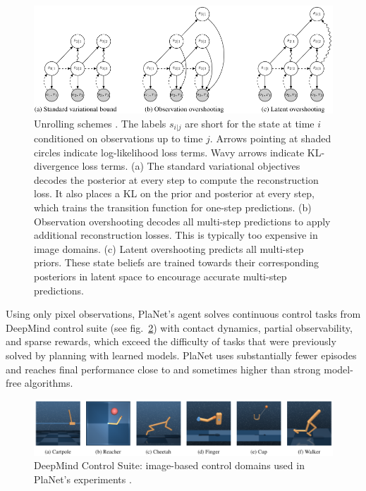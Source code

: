 \begin{figure}[H]
\includegraphics[width=1.0\textwidth,keepaspectratio]{figures/PlaNet/overshooting.png}
\caption[PlaNet latent dynamics model unrolling schemes]{Unrolling schemes \protect\cite{Algo.PlaNet}. The labels $s_{i|j}$ are short for the state at time $i$ conditioned on observations up to time $j$. Arrows pointing at shaded circles indicate log-likelihood loss terms. Wavy arrows indicate KL-divergence loss terms. (a) The standard variational objectives decodes the posterior at every step to compute the reconstruction loss. It also places a KL on the prior and posterior at every step, which trains the transition function for one-step predictions. (b) Observation overshooting decodes all multi-step predictions to apply additional reconstruction losses. This is typically too expensive in image domains. (c) Latent overshooting predicts all multi-step priors. These state beliefs are trained towards their corresponding posteriors in latent space to encourage accurate multi-step predictions.}
\label{Fig.PlaNetModelUnrolling}
\end{figure}

Using only pixel observations, PlaNet's agent solves continuous control tasks from DeepMind control suite (see fig.~\ref{Fig.DeepMindControlSuite}) with contact dynamics, partial observability, and sparse rewards, which exceed the difficulty of tasks that were previously solved by planning with learned models. PlaNet uses substantially fewer episodes and reaches final performance close to and sometimes higher than strong model-free algorithms.

\begin{figure}[H]
\includegraphics[width=1.0\textwidth,keepaspectratio]{figures/PlaNet/benchmarks.png}
\caption[DeepMind Control Suite]{DeepMind Control Suite: image-based control domains used in PlaNet's experiments \protect\cite{Algo.PlaNet}.}
\label{Fig.DeepMindControlSuite}
\end{figure}

